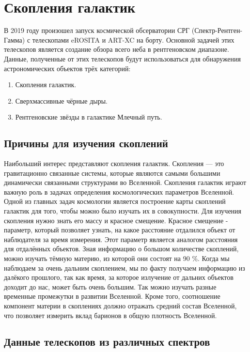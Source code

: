 \Introduction
\section{Скопления галактик}
В 2019 году произошел запуск космической обсерватории СРГ (Спектр-Рентген-Гамма) с телескопами 
eROSITA и ART-XC на борту. Основной задачей этих телескопов является создание обзора всего неба в 
рентгеновском диапазоне. Данные, полученные от этих телескопов будут использоваться для обнаружения 
астрономических объектов трёх категорий:

\begin{enumerate}
    \item Скопления галактик.
    \item Сверхмассивные чёрные дыры.
    \item Рентгеновские звёзды в галактике Млечный путь. 
\end{enumerate}

\subsection{Причины для изучения скоплений}

Наибольший интерес представляют скопления галактик. Скопления --- это гравитационно связанные 
системы, которые являются самыми большими динамически связанными структурами во Вселенной. 
Скопления галактик играют важную роль в задачах определения космологических параметров Вселенной.
Одной из главных задач космологии является построение карты скоплений галактик для того, чтобы 
можно было изучать их в совокупности. Для изучения скопления нужно знать его массу и красное 
смещение. Красное смещение - параметр, который позволяет узнать, на какое расстояние отдалился 
объект от наблюдателя за время измерения. Этот параметр является аналогом расстояния для отдалённых 
объектов. Зная информацию о большом количестве скоплений, можно изучать тёмную материю, из которой 
они состоят на 90 \%. Когда мы наблюдаем за очень дальним скоплением, мы по факту получаем 
информацию из далёкого прошлого, так как время, за которое излучение от дальних объектов доходит до 
нас, может быть очень большим. Так можно изучать разные временные промежутки в развитии Вселенной.
Кроме того, соотношение компонент материи в 
скоплениях должно отражать средний состав Вселенной, что позволяет измерить вклад барионов в общую
плотность Вселенной.\\

\subsection{Данные телескопов из различных спектров}

